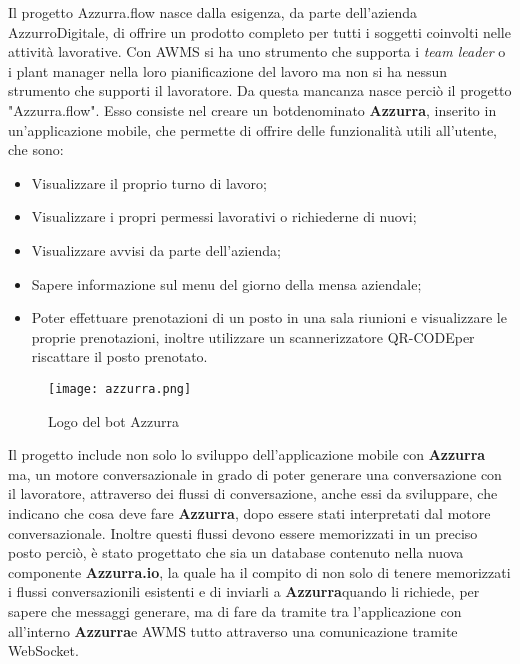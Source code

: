 Il progetto Azzurra.flow nasce dalla esigenza, da parte dell'azienda AzzurroDigitale, di offrire un prodotto completo per tutti i soggetti coinvolti nelle attività lavorative. Con \gls{AWMS} si ha uno strumento che supporta i \emph{team leader} o i \gls{plant manager} nella loro pianificazione del lavoro ma non si ha nessun strumento che supporti il lavoratore. Da questa mancanza nasce perciò il progetto "Azzurra.flow". Esso consiste nel creare un \gls{bot}\glsfirstoccur denominato \textbf{Azzurra}, inserito in un’applicazione mobile, che permette di offrire delle funzionalità utili all'utente, che sono:
\begin{itemize}
	\item Visualizzare il proprio turno di lavoro;
	\item Visualizzare i propri permessi lavorativi o richiederne di nuovi;
	\item Visualizzare avvisi da parte dell'azienda;
	\item Sapere informazione sul menu del giorno della mensa aziendale;
	\item Poter effettuare prenotazioni di un posto in una sala riunioni e visualizzare le proprie prenotazioni, inoltre utilizzare un scannerizzatore \gls{QR-CODE}\glsfirstoccur per riscattare il posto prenotato.
\end{itemize}
	\begin{figure}[!h] 
	\begin{center}
		\texttt{[image: azzurra.png]}
		\caption{Logo del bot Azzurra}
	\end{center}
\end{figure}
Il progetto include non solo lo sviluppo dell'applicazione mobile con \textbf{Azzurra} ma, un motore conversazionale in grado di poter generare una conversazione con il lavoratore, attraverso dei flussi di conversazione, anche essi da sviluppare, che indicano che cosa deve fare \textbf{Azzurra}, dopo essere stati interpretati dal motore conversazionale. Inoltre questi flussi devono essere memorizzati in un preciso posto perciò, è stato progettato che sia un database contenuto nella nuova componente \textbf{Azzurra.io}, la quale ha il compito di non solo di tenere memorizzati i flussi conversazionili esistenti e di inviarli a \textbf{Azzurra}quando li richiede, per sapere che messaggi generare, ma di fare da tramite tra l'applicazione con all'interno \textbf{Azzurra}e \gls{AWMS} tutto attraverso una comunicazione tramite \gls{WebSocket}\glsfirstoccur.

